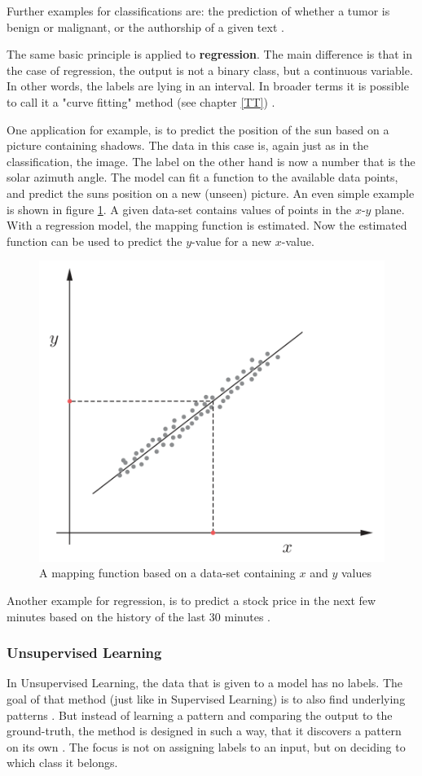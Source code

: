 Further examples for classifications are: the prediction of whether a tumor is benign or malignant, or the authorship of a given text \cite{Theodoridis}.




The same basic principle is applied to \textbf{regression}. The main difference is that in the case of regression, the output is not a binary class, but a continuous variable. In other words, the labels are lying in an interval. In broader terms it is possible to call it a "curve fitting" method (see chapter \ref{TT}) \cite{Theodoridis}.

One application for example, is to predict the position of the sun based on a picture containing shadows. The data in this case is, again just as in the classification, the image. The label on the other hand is now a number that is the solar azimuth angle. The model can fit a function to the available data points, and predict the suns position on a new (unseen) picture.
An even simple example is shown in figure \ref{fig:SimpleRegression}. A given data-set contains values of points in the \(x\)-\(y\) plane. With a regression model, the mapping function is estimated. Now the estimated function can be used to predict the \(y\)-value for a new \(x\)-value. 

\begin{figure}[H]
	\centering
	\includegraphics[width=0.5\linewidth]{IMGs/SimpleRegression.png}
	\caption{A mapping function based on a data-set containing \(x\) and \(y\) values \cite{Theodoridis}}
	\label{fig:SimpleRegression}
\end{figure}


Another example for regression, is to predict a stock price in the next few minutes based on the history of the last 30 minutes \cite{Janiesch}.



\subsubsection*{Unsupervised Learning}
In Unsupervised Learning, the data that is given to a model has no labels. The goal of that method (just like in Supervised Learning) is to also find underlying patterns \cite{Carleo}. But instead of learning a pattern and comparing the output to the ground-truth, the method is designed in such a way, that it discovers a pattern on its own \cite{Murphy}. The focus is not on assigning labels to an input, but on deciding to which class it belongs.


